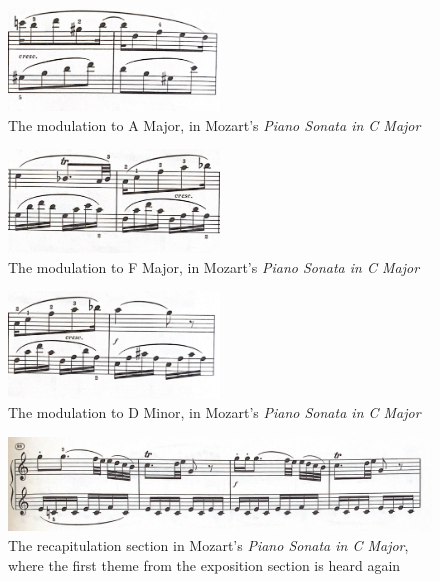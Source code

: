 \begin{figure}
    \centering
    \includegraphics[width=0.5\textwidth]{figures/mozart-first-movement-modulation-a-major.png}
    \caption{The modulation to A Major, in Mozart's \textit{Piano Sonata in C Major}}
    \label{fig:mozart-first-movement-modulation-a-major}
\end{figure}

\begin{figure}
    \centering
    \includegraphics[width=0.5\textwidth]{figures/mozart-first-movement-f-major.png}
    \caption{The modulation to F Major, in Mozart's \textit{Piano Sonata in C Major}}
    \label{fig:mozart-first-movement-f-major}
\end{figure}

\begin{figure}
    \centering
\includegraphics[width=0.5\textwidth]{figures/mozart-first-movement-d-minor.png}
    \caption{The modulation to D Minor, in Mozart's \textit{Piano Sonata in C Major}}
    \label{fig:mozart-first-movement-d-minor}
\end{figure}

\begin{figure}
    \centering
    \includegraphics[width=\textwidth]{figures/mozart-first-movement-recapitulation-first-theme.png}
    \caption[The first theme of the exposition, found in the recapitulation, from Mozart's \textit{Piano Sonata in C Major, K. 330}]{The recapitulation section in Mozart's \textit{Piano Sonata in C Major}, where the first theme from the exposition section is heard again}
    \label{fig:mozart-first-movement-recapitulation-first-theme}
\end{figure}


